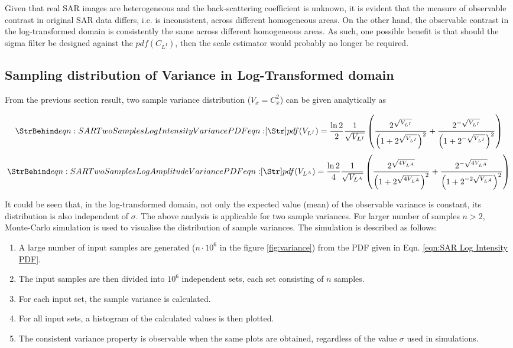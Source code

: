 Given that real SAR images are heterogeneous and the back-scattering coefficient is unknown, it is evident that 
the measure of observable contrast in original SAR data differs, i.e. is inconsistent, across different homogeneous 
areas. On the other hand, the observable contrast in the log-transformed domain is consistently the same across 
different homogeneous areas. As such, one possible benefit is that should the sigma filter \cite{Lee_TGRS_2009} be 
designed against the $pdf(C_{L^I})$, then the scale estimator would probably no longer be required. 

\subsection{Sampling distribution of Variance in Log-Transformed domain}

From the previous section result, two sample variance distribution ($V_x = C_x^2$) can be given analytically as

\begin{equation}
  \label{eqn: SAR Two Samples Log Intensity Variance PDF}
  \caption{eqn: SAR Two Samples Log Intensity Variance PDF}
pdf(V_{L^I}) = 
	\frac{\ln2}{2} \frac{1}{\sqrt{V_{L^I}}} \left( \frac{2^{\sqrt{V_{L^I}}}}{\left( 1+2^{\sqrt{V_{L^I}}} \right)^2} + \frac{2^{-\sqrt{V_{L^I}}}}{\left( 1+2^{-\sqrt{V_{L^I}}} \right)^2} \right)
\end{equation}
\begin{equation}
  \label{eqn: SAR Two Samples Log Amplitude Variance PDF}
  \caption{eqn: SAR Two Samples Log Amplitude Variance PDF}
pdf(V_{L^A}) =
	\frac{\ln2}{4} \frac{1}{\sqrt{V_{L^A}}} \left( \frac{2^{\sqrt{4 V_{L^A}}}}{\left( 1+2^{\sqrt{4 V_{L^A}}} \right)^2} + \frac{2^{-\sqrt{4 V_{L^A}}}}{\left( 1+2^{-2\sqrt{V_{L^A}}} \right)^2} \right)
\end{equation}

It could be seen that, in the log-transformed domain, not only the expected value (mean) of the observable variance is constant, its distribution is also independent of $\sigma$. 
The above analysis is applicable for two sample variances. 
For larger number of samples $n > 2$, Monte-Carlo simulation is used to visualise the distribution of sample variances. 
The simulation is described as follows:

\begin{enumerate}
\item A large number of input samples are generated ($n \cdot 10^6$ in the figure \ref{fig:variance}) from the PDF given in Eqn. \ref{eqn:SAR Log Intensity PDF}.
\item The input samples are then divided into $10^6$ independent sets, each set consisting of $n$ samples.
\item For each input set, the sample variance is calculated.
\item For all input sets, a histogram of the calculated values is then plotted.
\item The consistent variance property is observable when the same plots are obtained, regardless of the value $\sigma$ used in simulations.
\end{enumerate}

